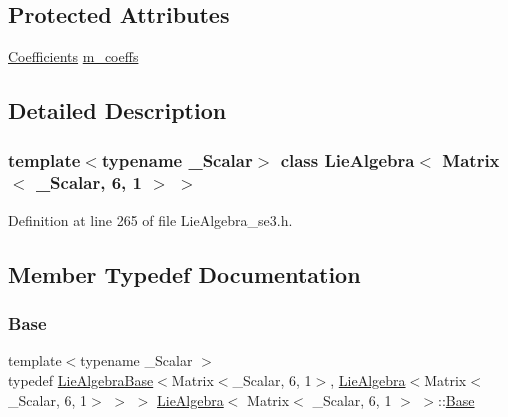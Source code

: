 \subsection*{Protected Attributes}
\begin{DoxyCompactItemize}
\item 
\hyperlink{class_lie_algebra_3_01_matrix_3_01___scalar_00_016_00_011_01_4_01_4_a2eb9bb9a54a2c7ce0b75b46814ea390e}{Coefficients} \hyperlink{class_lie_algebra_3_01_matrix_3_01___scalar_00_016_00_011_01_4_01_4_ae8bf705677cc037b0f98ca402025389f}{m\+\_\+coeffs}
\end{DoxyCompactItemize}


\subsection{Detailed Description}
\subsubsection*{template$<$typename \+\_\+\+Scalar$>$\newline
class Lie\+Algebra$<$ Matrix$<$ \+\_\+\+Scalar, 6, 1 $>$ $>$}



Definition at line 265 of file Lie\+Algebra\+\_\+se3.\+h.



\subsection{Member Typedef Documentation}
\hypertarget{class_lie_algebra_3_01_matrix_3_01___scalar_00_016_00_011_01_4_01_4_a864bf965fc88e54b2f8ff1e7dda63c66}{}\label{class_lie_algebra_3_01_matrix_3_01___scalar_00_016_00_011_01_4_01_4_a864bf965fc88e54b2f8ff1e7dda63c66} 
\subsubsection{\texorpdfstring{Base}{Base}}
{\footnotesize\ttfamily template$<$typename \+\_\+\+Scalar $>$ \\
typedef \hyperlink{class_lie_algebra_base}{Lie\+Algebra\+Base}$<$Matrix$<$\+\_\+\+Scalar, 6, 1$>$, \hyperlink{class_lie_algebra}{Lie\+Algebra}$<$Matrix$<$\+\_\+\+Scalar, 6, 1$>$ $>$ $>$ \hyperlink{class_lie_algebra}{Lie\+Algebra}$<$ Matrix$<$ \+\_\+\+Scalar, 6, 1 $>$ $>$\+::\hyperlink{class_lie_algebra_3_01_matrix_3_01___scalar_00_016_00_011_01_4_01_4_a864bf965fc88e54b2f8ff1e7dda63c66}{Base}\hspace{0.3cm}{\ttfamily [protected]}}

